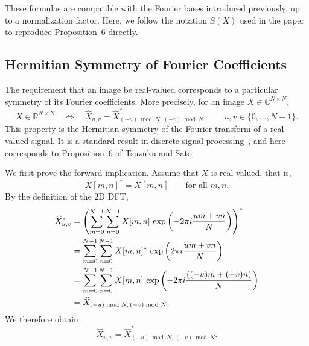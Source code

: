 These formulas are compatible with the Fourier bases introduced previously, up to a
normalization factor. Here, we follow the notation $S(X)$ used in the paper \cite{tsuzuku2019structural} to reproduce
Proposition~6 directly.

\subsection{Hermitian Symmetry of Fourier Coefficients}

The requirement that an image be real-valued corresponds to a particular symmetry of its Fourier
coefficients. More precisely, for an image $X\in\mathbb{C}^{N\times N}$,
\begin{equation}
    X\in\mathbb{R}^{N\times N}
    \quad\Longleftrightarrow\quad
    \widehat{X}_{u,v}
    =
    \widehat{X}^{*}_{(-u)\bmod N,\,(-v)\bmod N},
    \qquad
    u,v\in\{0,\dots,N-1\}.
    \label{eq:symetrie_hermitienne_fourier}
\end{equation}
This property is the Hermitian symmetry of the Fourier transform of a real-valued signal. It is
a standard result in discrete signal processing~\cite{oppenheim2009discrete}, and here corresponds to
Proposition~6 of Tsuzuku and Sato~\cite{tsuzuku2019structural}.

We first prove the forward implication. Assume that $X$ is real-valued, that is,
\[
    X[m,n]^* = X[m,n]
    \qquad
    \text{for all } m,n.
\]
By the definition of the 2D DFT,
\begin{align*}
    \widehat{X}^{*}_{u,v}
    &=
    \left(
        \sum_{m=0}^{N-1}\sum_{n=0}^{N-1}
        X[m,n]\,
        \exp\left(-2\pi i\frac{um+vn}{N}\right)
    \right)^* \notag \\
    &=
    \sum_{m=0}^{N-1}\sum_{n=0}^{N-1}
    X[m,n]^*\,
    \exp\left(2\pi i\frac{um+vn}{N}\right) \notag \\
    &=
    \sum_{m=0}^{N-1}\sum_{n=0}^{N-1}
    X[m,n]\,
    \exp\left(-2\pi i\frac{((-u)m+(-v)n)}{N}\right) \notag \\
    &=
    \widehat{X}_{(-u)\bmod N,\,(-v)\bmod N}.
\end{align*}
We therefore obtain
\[
    \widehat{X}_{u,v}
    =
    \widehat{X}^{*}_{(-u)\bmod N,\,(-v)\bmod N}.
\]

